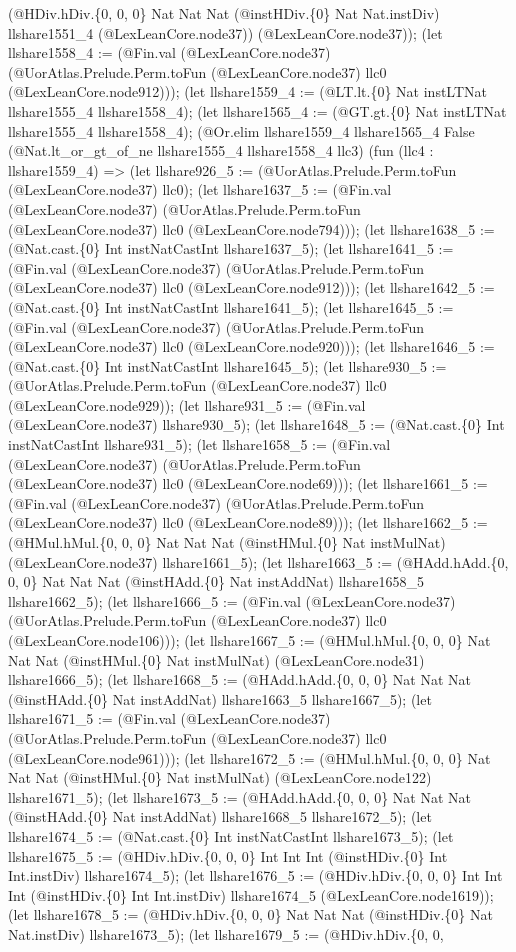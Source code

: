 \documentclass[11pt]{article}
\begin{document}
(@HDiv.hDiv.\{0, 0, 0\} Nat Nat Nat (@instHDiv.\{0\} Nat Nat.instDiv) llshare1551\_4 (@LexLeanCore.node37)) (@LexLeanCore.node37)); (let llshare1558\_4 := (@Fin.val (@LexLeanCore.node37) (@UorAtlas.Prelude.Perm.toFun (@LexLeanCore.node37) llc0 (@LexLeanCore.node912))); (let llshare1559\_4 := (@LT.lt.\{0\} Nat instLTNat llshare1555\_4 llshare1558\_4); (let llshare1565\_4 := (@GT.gt.\{0\} Nat instLTNat llshare1555\_4 llshare1558\_4); (@Or.elim llshare1559\_4 llshare1565\_4 False (@Nat.lt\_or\_gt\_of\_ne llshare1555\_4 llshare1558\_4 llc3) (fun (llc4 : llshare1559\_4) => (let llshare926\_5 := (@UorAtlas.Prelude.Perm.toFun (@LexLeanCore.node37) llc0); (let llshare1637\_5 := (@Fin.val (@LexLeanCore.node37) (@UorAtlas.Prelude.Perm.toFun (@LexLeanCore.node37) llc0 (@LexLeanCore.node794))); (let llshare1638\_5 := (@Nat.cast.\{0\} Int instNatCastInt llshare1637\_5); (let llshare1641\_5 := (@Fin.val (@LexLeanCore.node37) (@UorAtlas.Prelude.Perm.toFun (@LexLeanCore.node37) llc0 (@LexLeanCore.node912))); (let llshare1642\_5 := (@Nat.cast.\{0\} Int instNatCastInt llshare1641\_5); (let llshare1645\_5 := (@Fin.val (@LexLeanCore.node37) (@UorAtlas.Prelude.Perm.toFun (@LexLeanCore.node37) llc0 (@LexLeanCore.node920))); (let llshare1646\_5 := (@Nat.cast.\{0\} Int instNatCastInt llshare1645\_5); (let llshare930\_5 := (@UorAtlas.Prelude.Perm.toFun (@LexLeanCore.node37) llc0 (@LexLeanCore.node929)); (let llshare931\_5 := (@Fin.val (@LexLeanCore.node37) llshare930\_5); (let llshare1648\_5 := (@Nat.cast.\{0\} Int instNatCastInt llshare931\_5); (let llshare1658\_5 := (@Fin.val (@LexLeanCore.node37) (@UorAtlas.Prelude.Perm.toFun (@LexLeanCore.node37) llc0 (@LexLeanCore.node69))); (let llshare1661\_5 := (@Fin.val (@LexLeanCore.node37) (@UorAtlas.Prelude.Perm.toFun (@LexLeanCore.node37) llc0 (@LexLeanCore.node89))); (let llshare1662\_5 := (@HMul.hMul.\{0, 0, 0\} Nat Nat Nat (@instHMul.\{0\} Nat instMulNat) (@LexLeanCore.node37) llshare1661\_5); (let llshare1663\_5 := (@HAdd.hAdd.\{0, 0, 0\} Nat Nat Nat (@instHAdd.\{0\} Nat instAddNat) llshare1658\_5 llshare1662\_5); (let llshare1666\_5 := (@Fin.val (@LexLeanCore.node37) (@UorAtlas.Prelude.Perm.toFun (@LexLeanCore.node37) llc0 (@LexLeanCore.node106))); (let llshare1667\_5 := (@HMul.hMul.\{0, 0, 0\} Nat Nat Nat (@instHMul.\{0\} Nat instMulNat) (@LexLeanCore.node31) llshare1666\_5); (let llshare1668\_5 := (@HAdd.hAdd.\{0, 0, 0\} Nat Nat Nat (@instHAdd.\{0\} Nat instAddNat) llshare1663\_5 llshare1667\_5); (let llshare1671\_5 := (@Fin.val (@LexLeanCore.node37) (@UorAtlas.Prelude.Perm.toFun (@LexLeanCore.node37) llc0 (@LexLeanCore.node961))); (let llshare1672\_5 := (@HMul.hMul.\{0, 0, 0\} Nat Nat Nat (@instHMul.\{0\} Nat instMulNat) (@LexLeanCore.node122) llshare1671\_5); (let llshare1673\_5 := (@HAdd.hAdd.\{0, 0, 0\} Nat Nat Nat (@instHAdd.\{0\} Nat instAddNat) llshare1668\_5 llshare1672\_5); (let llshare1674\_5 := (@Nat.cast.\{0\} Int instNatCastInt llshare1673\_5); (let llshare1675\_5 := (@HDiv.hDiv.\{0, 0, 0\} Int Int Int (@instHDiv.\{0\} Int Int.instDiv) llshare1674\_5); (let llshare1676\_5 := (@HDiv.hDiv.\{0, 0, 0\} Int Int Int (@instHDiv.\{0\} Int Int.instDiv) llshare1674\_5 (@LexLeanCore.node1619)); (let llshare1678\_5 := (@HDiv.hDiv.\{0, 0, 0\} Nat Nat Nat (@instHDiv.\{0\} Nat Nat.instDiv) llshare1673\_5); (let llshare1679\_5 := (@HDiv.hDiv.\{0, 0, 
\end{document}
